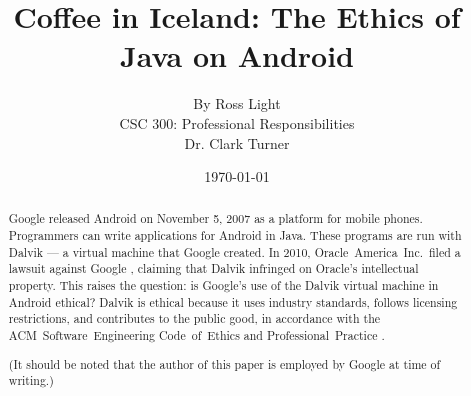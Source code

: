 \documentclass[11pt]{article}
\begin{document}
\title{\vfill Coffee in Iceland: The Ethics of Java on Android} %
\author{
By Ross Light \vspace{10pt} \\
CSC 300: Professional Responsibilities  \vspace{10pt} \\
Dr. Clark Turner \vspace{10pt} \\
}
\date{\today} %

\maketitle

\vfill  %
\begin{abstract} %

Google released Android on November 5, 2007 \cite{open-handset-alliance-ann} as
a platform for mobile phones. Programmers can write applications for Android in
Java.  These programs are run with Dalvik --- a virtual machine that Google
created.  In 2010, Oracle~America~Inc.\ filed a lawsuit against Google
\cite{oracle-lawsuit}, claiming that Dalvik infringed on Oracle's intellectual
property.  This raises the question: is Google's use of the Dalvik virtual
machine in Android ethical?  Dalvik is ethical because it uses industry
standards, follows licensing restrictions, and contributes to the public good,
in accordance with the ACM~Software~Engineering Code~of~Ethics and
Professional~Practice \cite{secode}.

(It should be noted that the author of this paper is employed by Google at time
of writing.)

\end{abstract} %

\thispagestyle{empty} %
\newpage

\thispagestyle{empty}  %
\tableofcontents

\newpage
\end{document}
